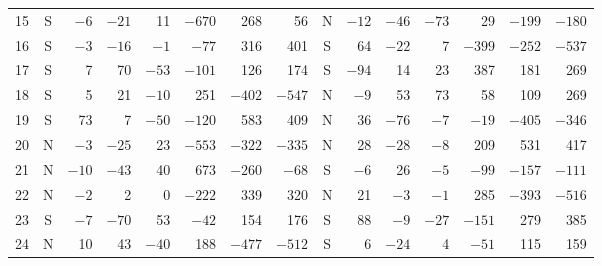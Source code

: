 \documentclass[11pt,a4paper]{amsart}
\theoremstyle{definition}
\theoremstyle{remark}
\numberwithin{equation}{section}
\begin{document}
\begin{table}[!htbp]
\begin{tabular}{@{}r@{\quad}c*{6}{r}@{\quad}c*{6}{r}@{}}
15 & S & $-6$ & $-21$ & 11 & $-670$ & 268 & 56 & N & $-12$ & $-46$ & $-73$ & 29 & $-199$ & $-180$\\
16 & S & $-3$ & $-16$ & $-1$ & $-77$ & 316 & 401 & S & 64 & $-22$ & 7 & $-399$ & $-252$ & $-537$\\
17 & S & 7 & 70 & $-53$ & $-101$ & 126 & 174 & S & $-94$ & 14 & 23 & 387 & 181 & 269\\
18 & S & 5 & 21 & $-10$ & 251 & $-402$ & $-547$ & N & $-9$ & 53 & 73 & 58 & 109 & 269\\
19 & S & 73 & 7 & $-50$ & $-120$ & 583 & 409 & N & 36 & $-76$ & $-7$ & $-19$ & $-405$ & $-346$\\
20 & N & $-3$ & $-25$ & 23 & $-553$ & $-322$ & $-335$ & N & 28 & $-28$ & $-8$ & 209 & 531 & 417\\
21 & N & $-10$ & $-43$ & 40 & 673 & $-260$ & $-68$ & S & $-6$ & 26 & $-5$ & $-99$ & $-157$ & $-111$\\
22 & N & $-2$ & 2 & 0 & $-222$ & 339 & 320 & N & 21 & $-3$ & $-1$ & 285 & $-393$ & $-516$\\
23 & S & $-7$ & $-70$ & 53 & $-42$ & 154 & 176 & S & 88 & $-9$ & $-27$ & $-151$ & 279 & 385\\
24 & N & 10 & 43 & $-40$ & 188 & $-477$ & $-512$ & S & 6 & $-24$ & 4 & $-51$ & 115 & 159\\
\bottomrule
\end{tabular}
\end{table}
\end{document}
